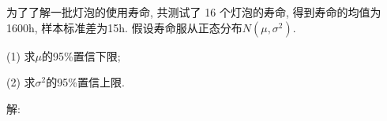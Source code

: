 \documentclass[standard]{ExBook}
\begin{document}
\begin{qitems}
\vspace{-5em}

    \begin{bbox}
    \begin{shaded}
        \qitem
为了了解一批灯泡的使用寿命, 共测试了 16 个灯泡的寿命, 得到寿命的均值为1600h, 样本标准差为15h. 假设寿命服从正态分布$N(\mu,\sigma^2)$.

(1) 求$\mu$的95\%置信下限;

(2) 求$\sigma^2$的95\%置信上限.
    \end{shaded}
    \end{bbox}

\vspace{-5em}

    \begin{bbox}
解: 
    \end{bbox}
\end{qitems}


\section{}
\end{document}
